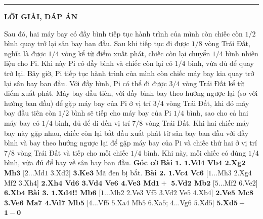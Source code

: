 \vspace*{-10pt}
\rule{1\linewidth}{0.1pt}
\begin{center}
	\textbf{\LARGE\color{cackithi}LỜI GIẢI, ĐÁP ÁN}
\end{center}
\begin{multicols}{2}
	Sau đó, hai máy bay có đầy bình tiếp tục hành trình của mình còn chiếc còn $1/2$ bình quay trở lại sân bay ban đầu. 
	\vskip 0.05cm
	Sau khi tiếp tục đi được $1/8$ vòng Trái Đất, nghĩa là được $1/4$ vòng kể từ điểm xuất phát, chiếc còn lại chuyển $1/4$ bình nhiên liệu cho Pi. Khi này Pi có đầy bình và chiếc còn lại có $1/4$ bình, vừa đủ để quay trở lại. Bây giờ, Pi tiếp tục hành trình của mình còn chiếc máy bay kia quay trở lại sân bay ban đầu. Với đầy bình, Pi có thể đi được $3/4$ vòng Trái Đất kể từ điểm xuất phát. 
	\vskip 0.05cm
	Máy bay đầu tiên, với đầy bình bay theo hướng ngược lại (so với hướng ban đầu) để gặp máy bay của Pi ở vị trí $3/4$ vòng Trái Đất, khi đó máy bay đầu tiên còn $1/2$ bình sẽ tiếp cho máy bay của Pi $1/4$ bình, sao cho cả hai máy bay có $1/4$ bình, đủ để đi đến vị trí $7/8$ vòng Trái Đất. Khi hai chiếc máy bay này gặp nhau, chiếc còn lại bắt đầu xuất phát từ sân bay ban đầu với đầy bình và bay theo hướng ngược lại để gặp máy bay của Pi và chiếc thứ hai ở vị trí $7/8$ vòng Trái Đất và tiếp cho mỗi chiếc $1/4$ bình. Khi này, mỗi chiếc có đúng $1/4$ bình, vừa đủ để bay về sân bay ban đầu.   
	\vskip 0.05cm
	\textbf{\color{cackithi}Góc cờ}
	\vskip 0.05cm
	\textbf{\color{cackithi}Bài $\pmb{1}$.
				$\pmb{1}$.Vd$\pmb{4}$ Vb$\pmb{4}$ $\pmb{2}$.Xg$\pmb{2}$ Mh$\pmb{3}$} [$2$...Md$1$ $3$.Xd$2$]
	\vskip 0.05cm
	\textbf{\color{cackithi}$\pmb{3}$.Ke$\pmb{3}$} Mã đen bị bắt.
	\vskip 0.05cm
	\textbf{\color{cackithi}Bài $\pmb{2}$. 
				$\pmb{1}$.Vc$\pmb{4}$ Vc$\pmb{6}$} [$1$...Mh$3$ $2$.Xg$4$ Mf$2$ $3$.Xh$4$]
	\vskip 0.05cm
	\textbf{\color{cackithi}$\pmb{2}$.Xh$\pmb{4}$ Vd$\pmb{6}$ $\pmb{3}$.Vd$\pmb{4}$ Ve$\pmb{6}$ $\pmb{4}$.Ve$\pmb{3}$ Md$\pmb{1+}$ $\pmb{5}$.Vd$\pmb{2}$ Mb$\pmb{2}$} [$5$...Mf$2$ $6$.Ve$2$]
	\vskip 0.05cm
	\textbf{\color{cackithi}$\pmb{6}$.Xb$\pmb{4}$}
	\vskip 0.05cm
	\textbf{\color{cackithi}Bài $\pmb{3}$.
				$\pmb{1}$.Xd$\pmb{4}$!! Mb$\pmb{6}$} [$1$...Mb$2$ $2$.Ve$3$ Vf$5$ $3$.Vd$2$ Ve$5$ $4$.Xb$4$]
	\vskip 0.05cm
	\textbf{\color{cackithi}$\pmb{2}$.Ve$\pmb{5}$ Mc$\pmb{8}$ $\pmb{3}$.Ve$\pmb{6}$ Ma$\pmb{7}$ $\pmb{4}$.Vd$\pmb{7}$ Mb$\pmb{5}$} [$4$...Vf$5$ $5$.Xa$4$ Mb$5$ $6$.Xa$5$; $4$...Vg$6$ $5$.Xd$5$]
	\vskip 0.05cm
	\textbf{\color{cackithi}$\pmb{5}$.Xd$\pmb{5+}$}
	\vskip 0.05cm
	$\pmb{1-0}$
\end{multicols}
